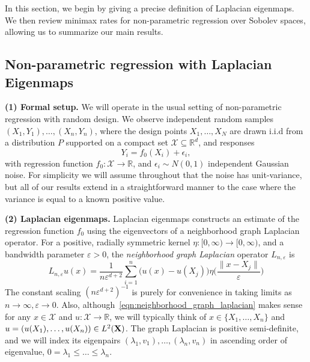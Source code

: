 \documentclass{article}
\newcommand{\Reals}{\mathbb{R}}
\newcommand{\1}{\mathbf{1}}
\newcommand{\Rd}{\Reals^d}
\newcommand{\Leb}{L}
\newcommand{\mc}[1]{\mathcal{#1}}
\theoremstyle{alden}
\theoremstyle{aldenthm}
\theoremstyle{definition}
\theoremstyle{remark}
\begin{document}
In this section, we begin by giving a precise definition of Laplacian eigenmaps. We then review minimax rates for non-parametric regression over Sobolev spaces, allowing us to summarize our main results. 

\subsection{Non-parametric regression with Laplacian Eigenmaps}
\label{sec:regression_laplacian_eigenmaps}

\textbf{(1) Formal setup.}
We will operate in the usual setting of non-parametric regression with random design. We observe independent random samples $(X_1,Y_1),\ldots,(X_n,Y_n)$, where the design points $X_1,\ldots,X_N$ are drawn i.i.d from a distribution $P$ supported on a compact set $\mc{X} \subseteq \Rd$, and responses
\begin{equation*}
Y_i = f_0(X_i) + \epsilon_i,
\end{equation*}
with regression function $f_0: \mc{X} \to \Reals$, and $\epsilon_i \sim N(0,1)$ independent Gaussian noise. For simplicity we will assume throughout that the noise has unit-variance, but all of our results extend in a straightforward manner to the case where the variance is equal to a known positive value. 

\textbf{(2) Laplacian eigenmaps.} Laplacian eigenmaps constructs an estimate of the regression function $f_0$ using the eigenvectors of a neighborhood graph Laplacian operator. For a positive, radially symmetric kernel $\eta: [0,\infty) \to [0,\infty)$, and a bandwidth parameter $\varepsilon > 0$, the \emph{neighborhood graph Laplacian} operator $L_{n,\varepsilon}$ is
\begin{equation}
\label{eqn:neighborhood_graph_laplacian}
L_{n,\varepsilon}u(x) = \frac{1}{n\varepsilon^{d + 2}} \sum_{i = 1}^{n} \bigl(u(x) - u(X_j)\bigr) \eta\biggl(\frac{\|x - X_j\|}{\varepsilon}\biggr)
\end{equation}
The constant scaling $(n\varepsilon^{d + 2})^{-1}$ is purely for convenience in taking limits as $n \to \infty, \varepsilon \to 0$. Also, although~\eqref{eqn:neighborhood_graph_laplacian} makes sense for any $x \in \mc{X}$ and $u: \mc{X} \to \Reals$, we will typically think of $x \in \{X_1,\ldots,X_n\}$ and $u = (u(X_1),\ldots,u(X_n)) \in \Leb^2({\bf X})$. The graph Laplacian is positive semi-definite, and we will index its eigenpairs $(\lambda_1,v_1),\ldots,(\lambda_n,v_n)$ in ascending order of eigenvalue, $0 = \lambda_1 \leq \ldots \leq \lambda_n$. 
\end{document}
